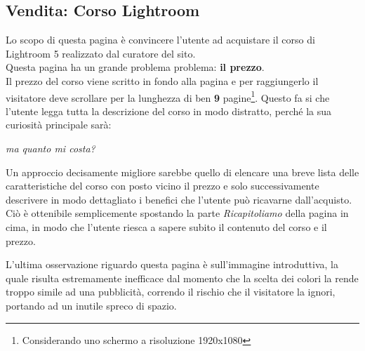 \subsection{Vendita: Corso Lightroom}\label{lightroom}
Lo scopo di questa pagina è convincere l'utente ad acquistare il corso di Lightroom 5 realizzato dal curatore del sito.\\
Questa pagina ha un grande problema problema: \textbf{il prezzo}.\\
Il prezzo del corso viene scritto in fondo alla pagina e per raggiungerlo il visitatore deve scrollare per la lunghezza di ben \textbf{9} pagine\footnote{Considerando uno schermo a risoluzione 1920x1080}. Questo fa si che l'utente legga tutta la descrizione del corso in modo distratto, perché la sua curiosità principale sarà:
\begin{center}
\textit{ma quanto mi costa?}
\end{center}

Un approccio decisamente migliore sarebbe quello di elencare una breve lista delle caratteristiche del corso con posto vicino il prezzo e solo successivamente descrivere in modo dettagliato i benefici che l'utente può ricavarne dall'acquisto.
Ciò è ottenibile semplicemente spostando la parte \textit{Ricapitoliamo} della pagina in cima, in modo che l'utente riesca a sapere subito il contenuto del corso e il prezzo.

L'ultima osservazione riguardo questa pagina è sull'immagine introduttiva, la quale risulta estremamente inefficace dal momento che la scelta dei colori la rende troppo simile ad una pubblicità, correndo il rischio che il visitatore la ignori, portando ad un inutile spreco di spazio.